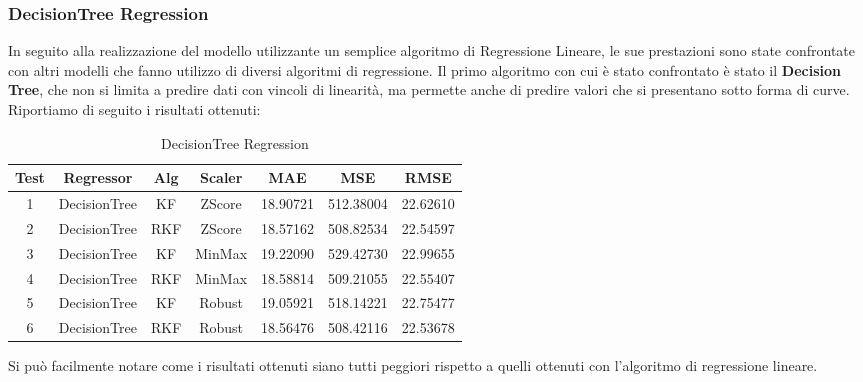 \subsubsection{DecisionTree Regression}
\fancyhead[]{}

In seguito alla realizzazione del modello utilizzante un semplice algoritmo di Regressione
Lineare, le sue prestazioni sono state confrontate con altri modelli che fanno utilizzo di diversi
algoritmi di regressione. Il primo algoritmo con cui è stato confrontato è stato il \textbf{Decision Tree}, che non si limita a predire dati con vincoli di linearità, ma permette anche di predire
valori che si presentano sotto forma di curve.\\
Riportiamo di seguito i risultati ottenuti:
\begin{table}[!htbp]
    \centering
    \caption{DecisionTree Regression}
    \begin{tabular}{|c|c|c|c|c|c|c|}
        \hline
        Test & Regressor & Alg & Scaler & MAE & MSE & RMSE \\
        \hline
        1 & DecisionTree & KF & ZScore & 18.90721 & 512.38004 & 22.62610 \\
        \hline
        2 & DecisionTree & RKF & ZScore & 18.57162 & 508.82534 & 22.54597 \\
        \hline
        3 & DecisionTree & KF & MinMax & 19.22090 & 529.42730 & 22.99655 \\
        \hline
        4 & DecisionTree & RKF & MinMax & 18.58814 & 509.21055 & 22.55407 \\
        \hline
        5 & DecisionTree & KF & Robust & 19.05921 & 518.14221 & 22.75477 \\
        \hline
        6 & DecisionTree & RKF & Robust & 18.56476 & 508.42116 & 22.53678 \\
        \hline
    \end{tabular}
    \label{tab:reference}
\end{table}

Si può facilmente notare come i risultati ottenuti siano tutti peggiori rispetto a quelli
ottenuti con l’algoritmo di regressione lineare.